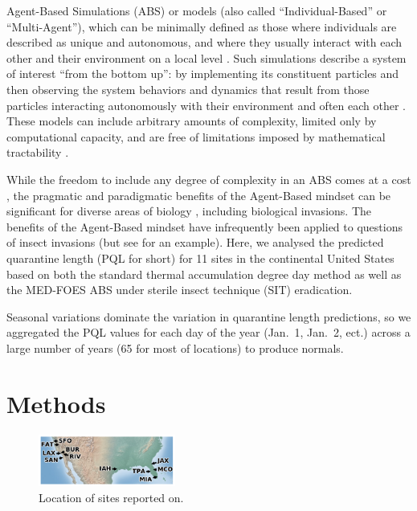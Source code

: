 \documentclass[10pt,a4paper,twocolumn]{article}
\begin{document}
Agent-Based
Simulations (ABS) or models (also called ``Individual-Based'' or
	``Multi-Agent''), which can be minimally defined as those where
individuals are described as unique and autonomous, and where they usually
interact with each other and their environment on a local level
\cite{Railsback2011Agent}. Such simulations describe a system of
interest ``from the bottom up'': by implementing its constituent particles and
then observing the system behaviors and dynamics that result from those
particles interacting autonomously with their environment and often each other
\cite{Bonabeau2002Agent}. These models can include arbitrary amounts of complexity, limited
only by computational capacity, and are free of limitations imposed by mathematical 
tractability \cite{Huston1988New}.

While the freedom to include any degree of complexity
in an ABS comes at a cost
\citep{Deangelis1994Individual,Grimm1999Ten,Hales2003Model}, the pragmatic and
paradigmatic benefits of the Agent-Based mindset can be significant for diverse
areas of biology \citep{Macal2010Tutorial,Railsback2011Agent}, including biological
invasions. The benefits of the Agent-Based mindset have infrequently been 
applied to
questions of insect invasions \citep{vinatier2011factors} (but see \citet{crespo2011modeling}
for an example). Here, we analysed the predicted quarantine length (PQL for short) 
for 11 sites in the continental United States
based on both the standard thermal accumulation degree day method\cite{ECY:ECY1969503514} 
as well as the MED-FOES\cite{manoukis_computer_2014} ABS  under sterile insect technique (SIT)\cite{??} eradication.

Seasonal variations dominate the variation in quarantine length predictions, 
so we aggregated the PQL values for each day of the year (Jan.\ 1, Jan.\ 2, ect.) 
across a large number of years (65 for most of locations) to produce normals.



\section*{Methods}

\begin{figure}
\centering
\includegraphics[width=0.4\textwidth]{figs/sitemap.pdf}
\caption{\label{fig:sitemap}Location of sites reported on.}
\end{figure}
\end{document}

